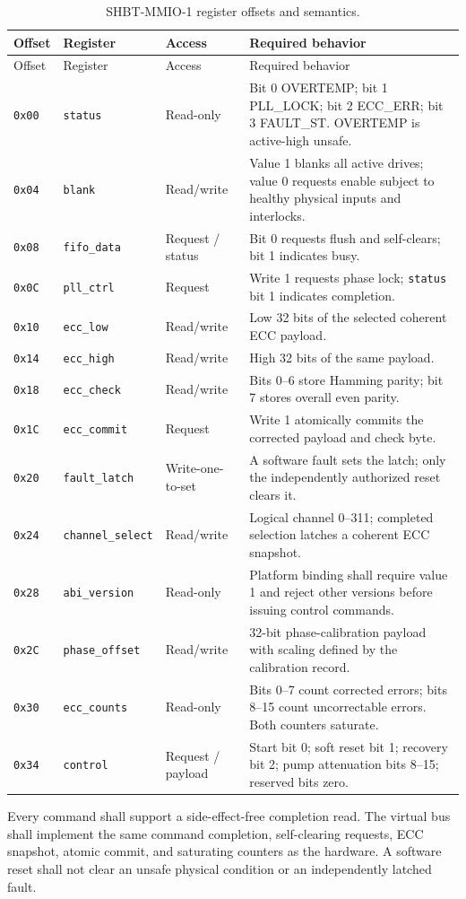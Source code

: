 \documentclass[11pt,a4paper]{article}
\begin{document}
\begin{longtable}{@{}P{1.4cm}P{3.0cm}P{2.0cm}P{8.5cm}@{}}
\caption{SHBT-MMIO-1 register offsets and semantics.}\label{tab:twin-mmio}\\
\toprule Offset & Register & Access & Required behavior\\\midrule\endfirsthead
\toprule Offset & Register & Access & Required behavior\\\midrule\endhead
\bottomrule\endfoot
\texttt{0x00} & \texttt{status} & Read-only & Bit 0 OVERTEMP; bit 1 PLL\_LOCK; bit 2 ECC\_ERR; bit 3 FAULT\_ST. OVERTEMP is active-high unsafe.\\
\texttt{0x04} & \texttt{blank} & Read/write & Value 1 blanks all active drives; value 0 requests enable subject to healthy physical inputs and interlocks.\\
\texttt{0x08} & \texttt{fifo\_data} & Request / status & Bit 0 requests flush and self-clears; bit 1 indicates busy.\\
\texttt{0x0C} & \texttt{pll\_ctrl} & Request & Write 1 requests phase lock; \texttt{status} bit 1 indicates completion.\\
\texttt{0x10} & \texttt{ecc\_low} & Read/write & Low 32 bits of the selected coherent ECC payload.\\
\texttt{0x14} & \texttt{ecc\_high} & Read/write & High 32 bits of the same payload.\\
\texttt{0x18} & \texttt{ecc\_check} & Read/write & Bits 0--6 store Hamming parity; bit 7 stores overall even parity.\\
\texttt{0x1C} & \texttt{ecc\_commit} & Request & Write 1 atomically commits the corrected payload and check byte.\\
\texttt{0x20} & \texttt{fault\_latch} & Write-one-to-set & A software fault sets the latch; only the independently authorized reset clears it.\\
\texttt{0x24} & \texttt{channel\_select} & Read/write & Logical channel 0--311; completed selection latches a coherent ECC snapshot.\\
\texttt{0x28} & \texttt{abi\_version} & Read-only & Platform binding shall require value 1 and reject other versions before issuing control commands.\\
\texttt{0x2C} & \texttt{phase\_offset} & Read/write & 32-bit phase-calibration payload with scaling defined by the calibration record.\\
\texttt{0x30} & \texttt{ecc\_counts} & Read-only & Bits 0--7 count corrected errors; bits 8--15 count uncorrectable errors. Both counters saturate.\\
\texttt{0x34} & \texttt{control} & Request / payload & Start bit 0; soft reset bit 1; recovery bit 2; pump attenuation bits 8--15; reserved bits zero.\\
\end{longtable}
Every command shall support a side-effect-free completion read. The virtual bus
shall implement the same command completion, self-clearing requests, ECC snapshot,
atomic commit, and saturating counters as the hardware. A software reset shall not
clear an unsafe physical condition or an independently latched fault.
\end{document}
